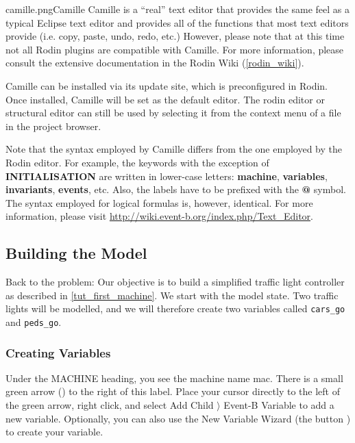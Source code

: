 \begin{rodin-plugin}{camille.png}{Camille}
Camille is a ``real'' text editor that provides the same feel as a typical Eclipse text editor and provides all of the functions that most text editors provide (i.e. copy, paste, undo, redo, etc.)  However, please note that at this time not all Rodin plugins are compatible with Camille.  For more information, please consult the extensive documentation in the Rodin Wiki (\ref{rodin_wiki}).

Camille can be installed via its update site, which is preconfigured in Rodin.  Once installed, Camille will be set as the default editor.
The rodin editor or structural editor can still be used by selecting it from the context menu of a file in the project browser.

Note that the syntax employed by Camille differs from the one employed by the Rodin editor.
For example, the keywords with the exception of \textbf{INITIALISATION} are written in lower-case letters: \textbf{machine}, \textbf{variables}, \textbf{invariants}, \textbf{events}, etc. Also, the labels have to be prefixed with the \textbf{@} symbol.
The syntax employed for logical formulas is, however, identical.
For more information, please visit \url{http://wiki.event-b.org/index.php/Text_Editor}.


\end{rodin-plugin}

\subsection{Building the Model}
\label{tut_building_the_model}

Back to the problem: Our objective is to build a simplified traffic light controller as described in \ref{tut_first_machine}.  We start with the model state.  Two traffic lights will be modelled, and we will therefore create two variables called  \texttt{cars\_go} and \texttt{peds\_go}.  

\subsubsection{Creating Variables}

Under the \textsf{MACHINE} heading, you see the machine name \textsf{mac}. There is a small green arrow () to the right of this label. Place your cursor directly to the left of the green arrow, right click, and select \textsf{Add Child $\rangle$ Event-B Variable} to add a new variable. Optionally, you can also use the New Variable Wizard (the button ) to create your variable. 

